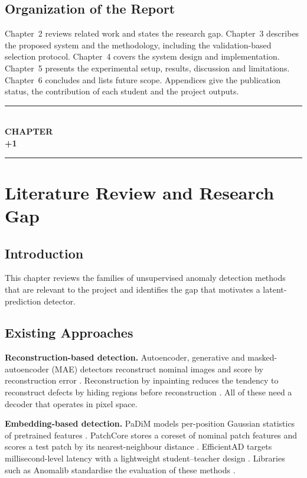 \documentclass[12pt,a4paper,oneside]{report}
\newcommand{\chapterseparator}{
    \clearpage
    \thispagestyle{empty}
    \begin{center}
        \vspace*{5cm}
        \rule{0.65\textwidth}{0.5pt}\\[1.2cm]
        {\fontsize{16}{20}\selectfont\bfseries CHAPTER}\\[0.8cm]
        {\fontsize{24}{28}\selectfont\bfseries \the\numexpr\value{chapter}+1\relax}\\[1.2cm]
        \rule{0.65\textwidth}{0.5pt}
    \end{center}
    \clearpage
}
\begin{document}
\section{Organization of the Report}

Chapter~2 reviews related work and states the research gap. Chapter~3
describes the proposed system and the methodology, including the
validation-based selection protocol. Chapter~4 covers the system design and
implementation. Chapter~5 presents the experimental setup, results,
discussion and limitations. Chapter~6 concludes and lists future scope.
Appendices give the publication status, the contribution of each student and
the project outputs.

\chapterseparator
\chapter{Literature Review and Research Gap}

\section{Introduction}

This chapter reviews the families of unsupervised anomaly detection
methods that are relevant to the project and identifies the gap that
motivates a latent-prediction detector.

\section{Existing Approaches}

\textbf{Reconstruction-based detection.} Autoencoder, generative and
masked-autoencoder (MAE) detectors reconstruct nominal images and score by
reconstruction error \cite{he2022mae,zavrtanik2021draem}. Reconstruction by
inpainting reduces the tendency to reconstruct defects by hiding regions
before reconstruction \cite{zavrtanik2021inpainting}. All of these need a
decoder that operates in pixel space.

\textbf{Embedding-based detection.} PaDiM models per-position Gaussian
statistics of pretrained features \cite{defard2021padim}. PatchCore stores a
coreset of nominal patch features and scores a test patch by its
nearest-neighbour distance \cite{roth2022patchcore}. EfficientAD targets
millisecond-level latency with a lightweight student--teacher design
\cite{batzner2024efficientad}. Libraries such as Anomalib standardise the
evaluation of these methods \cite{akcay2022anomalib}.
\end{document}
